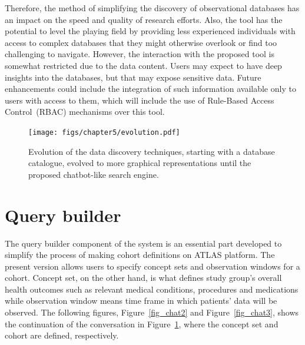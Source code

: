 Therefore, the method of simplifying the discovery of observational databases has an impact on the speed and quality of research efforts. Also, the tool has the potential to level the playing field by providing less experienced individuals with access to complex databases that they might otherwise overlook or find too challenging to navigate. However, the interaction with the proposed tool is somewhat restricted due to the data content. Users may expect to have deep insights into the databases, but that may expose sensitive data. Future enhancements could include the integration of such information available only to users with access to them, which will include the use of Rule-Based Access Control~(RBAC) mechanisms over this tool.



\begin{figure}[H]
    \texttt{[image: figs/chapter5/evolution.pdf]}
    \centering
	\caption[Evolution of the data discovery techniques]{Evolution of the data discovery techniques, starting with a database catalogue, evolved to more graphical representations until the proposed chatbot-like search engine.}
    \label{fig_chat1}
\end{figure}


\section{Query builder}



The query builder component of the system is an essential part developed to simplify the process of making cohort definitions on ATLAS platform. The present version allows users to specify concept sets and observation windows for a cohort. Concept set, on the other hand, is what defines study group's overall health outcomes such as relevant medical conditions, procedures and medications while observation window means time frame in which patients' data will be observed. The following figures, Figure~\ref{fig_chat2} and Figure~\ref{fig_chat3}, shows the continuation of the conversation in Figure~\ref{fig_chat1}, where the concept set and cohort are defined, respectively.

